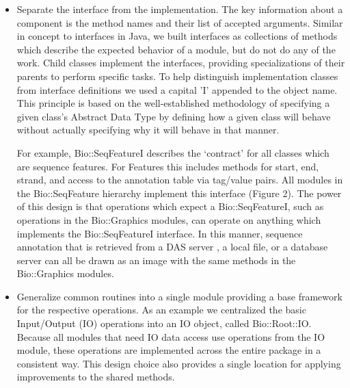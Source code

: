 \documentclass[12pt]{article}
\begin{document}
\begin{itemize}

\item Separate the interface from the implementation.  The key
information about a component is the method names and their list of
accepted arguments.  Similar in concept to interfaces in Java, we
built interfaces as collections of methods which describe the expected
behavior of a module, but do not do any of the work.  Child classes
implement the interfaces, providing specializations of their parents
to perform specific tasks.  To help distinguish implementation classes
from interface definitions we used a capital 'I' appended to the
object name.  This principle is based on the well-established
methodology of specifying a given class's Abstract Data Type by
defining how a given class will behave without actually specifying why
it will behave in that manner.

For example, Bio::SeqFeatureI describes the `contract' for all classes
which are sequence features.  For Features this includes methods for
start, end, strand, and access to the annotation table via tag/value
pairs.  All modules in the Bio::SeqFeature hierarchy implement this
interface (Figure 2).  The power of this design is that operations
which expect a Bio::SeqFeatureI, such as operations in the
Bio::Graphics modules, can operate on anything which implements the
Bio::SeqFeatureI interface.  In this manner, sequence annotation that
is retrieved from a DAS server \cite{das}, a local file, or a database
server can all be drawn as an image with the same methods in the
Bio::Graphics modules.

\item Generalize common routines into a single module providing a base
framework for the respective operations.  As an example we centralized
the basic Input/Output (IO) operations into an IO object, called
Bio::Root::IO.  Because all modules that need IO data access use
operations from the IO module, these operations are implemented across
the entire package in a consistent way.  This design choice also
provides a single location for applying improvements to the shared
methods.  


\end{itemize}
\end{document}
